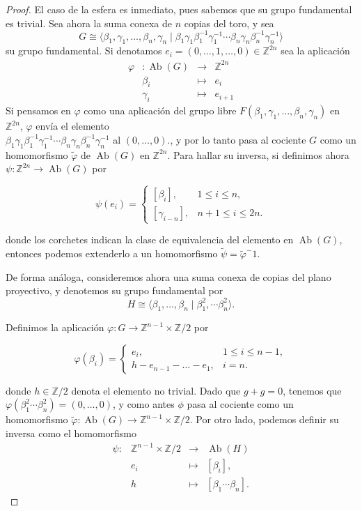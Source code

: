 \documentclass[10pt]{report}
\DeclareMathOperator{\Ab}{Ab}
\theoremstyle{definition}
\begin{document}
\begin{proof}
El caso de la esfera es inmediato, pues sabemos que su grupo fundamental es trivial.
Sea ahora la suma conexa de $n$ copias del toro, y sea
\[ 
G\cong \langle \beta_1 , \gamma_1 , \dots , \beta_n, \gamma_n \mid \beta_1 \gamma_1 \beta_1^{-1} \gamma_1^{-1} \cdots \beta_n \gamma_n \beta_n^{-1} \gamma_n^{-1} \rangle
\]
su grupo fundamental. Si denotamos $e_i=(0,\dots ,1, \dots ,0) \in \mathbb{Z}^{2n}$ sea la aplicación
\[
\begin{array}{rccl}
\varphi &: \Ab{(G)} & \to & \mathbb{Z}^{2n}\\
& \beta_i & \mapsto & e_i \\
& \gamma_i & \mapsto & e_{i+1}
\end{array}
\]
Si pensamos en $\varphi$ como una aplicación del grupo libre $F(\beta_1 , \gamma_1 , \dots , \beta_n, \gamma_n )$ en $\mathbb{Z}^{2n}$, $\varphi$ envía el elemento\\ $\beta_1 \gamma_1 \beta_1^{-1} \gamma_1^{-1} \cdots \beta_n \gamma_n \beta_n^{-1} \gamma_n^{-1}$ al $(0,\dots ,0)$., y por lo tanto pasa al cociente $G$ como un homomorfismo $\tilde{\varphi}$ de $\Ab{(G)}$ en $\mathbb{Z}^{2n}$. Para hallar su inversa, si definimos ahora  $\psi: \mathbb{Z}^{2n}\to \Ab{(G)}$ por

\[
\psi (e_i) = \left\{ 
\begin{array}{ll}
\left[ \beta_i \right] , & 1\leq i \leq n, \\
\left[ \gamma_{i-n} \right] , & n+1 \leq i \leq 2n.
\end{array} 
\right.
\]

donde los corchetes indican la clase de equivalencia del elemento en $\Ab{(G)}$, entonces podemos extenderlo a un homomorfismo $\tilde{\psi}=\tilde{\varphi}^-1$.

De forma análoga, consideremos ahora una suma conexa de copias del plano proyectivo, y denotemos su grupo fundamental por
\[
H \cong \langle \beta_1 , \dots , \beta_n \mid \beta_1^2 , \cdots \beta_n^2 \rangle .
\]

Definimos la aplicación $\varphi : G \to \mathbb{Z}^{n-1} \times \mathbb{Z}/2$ por

\[
\varphi (\beta_i) = \left\{ 
\begin{array}{ll}
e_i , & 1\leq i \leq n-1, \\
h-e_{n-1} - \dots - e_1, & i=n. 
\end{array} 
\right.
\]

donde $h\in \mathbb{Z}/2$ denota el elemento no trivial. Dado que $g+g=0$, tenemos que $\varphi \left( \beta_1^2 \cdots \beta_n^2\right) =(0, \dots ,0)$,  y como antes $\phi$ pasa al cociente como un homomorfismo $\tilde{\varphi} :  \Ab{(G)} \to \mathbb{Z}^{n-1} \times \mathbb{Z}/2 $. Por otro lado, podemos definir su inversa como el homomorfismo 
\[
\begin{array}{rccl}
\psi : & \mathbb{Z}^{n-1}  \times \mathbb{Z}/2 & \to & \Ab{(H)} \\
&e_i & \mapsto & \left[ \beta_i \right], \\
&h &\mapsto & \left[ \beta_1 \cdots \beta_n \right].
\end{array}
\]


\end{proof}
\end{document}
